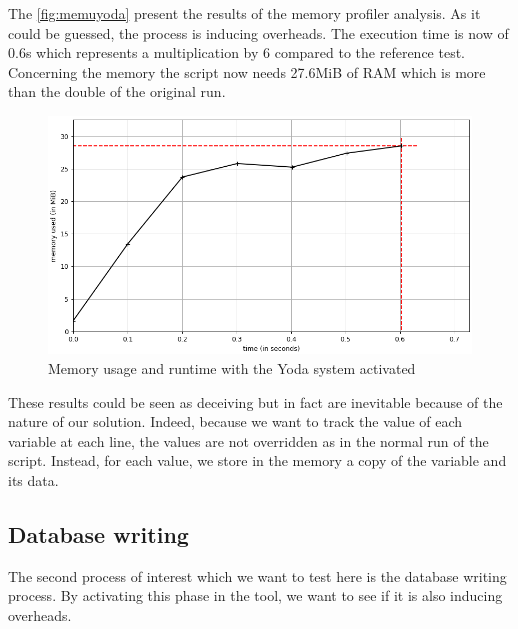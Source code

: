 The \autoref{fig:memuyoda} present the results of the memory profiler analysis. As it could be guessed, the process is inducing overheads. The execution time is now of 0.6s which represents a multiplication by 6 compared to the reference test. Concerning the memory the script now needs 27.6MiB of RAM which is more than the double of the original run.
\begin{figure}[h!]
  \centering
    \includegraphics[width=\textwidth]{figures/experiments_figure_yoda.png}
    \caption{Memory usage and runtime with the Yoda system activated}
    \label{fig:memuyoda}
\end{figure}

These results could be seen as deceiving but in fact are inevitable because of the nature of our solution. Indeed, because we want to track the value of each variable at each line, the values are not overridden as in the normal run of the script. Instead, for each value, we store in the memory a copy of the variable and its data.

\subsection{Database writing}
The second process of interest which we want to test here is the database writing process. By activating this phase in the tool, we want to see if it is also inducing overheads. 

